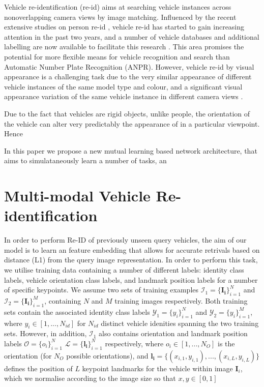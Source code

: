 \documentclass[10pt,twocolumn,letterpaper]{article}
\begin{document}
Vehicle re-identification (re-id) aims at searching vehicle instances across nonoverlapping camera views by image matching. Influenced by the recent extensive studies on person re-id \cite{gong2014re}, vehicle re-id has started to gain increasing attention in the past two years, and a number of vehicle databases and additional labelling are now available to facilitate this research \cite{liu2016vehicleid,liu2016veri,yang2015large,kanaci2018vehicle,wang2017orientation}. This area promises the potential for more flexible means for vehicle recognition and search than Automatic Number Plate Recognition (ANPR). However, vehicle re-id by visual appearance is a
challenging task due to the very similar appearance of different vehicle instances
of the same model type and colour, and a significant visual appearance variation
of the same vehicle instance in different camera views \cite{}.


Due to the fact that vehicles are rigid objects, unlike people, the orientation of the vehicle can alter very predictably the appearance of in a particular viewpoint. Hence

In this paper we propose a new mutual learning based network architecture, that aims to simulataneously learn a number of tasks, an

\section{Multi-modal Vehicle Re-identification}

In order to perform Re-ID of previously unseen query vehicles, the aim of our model is to learn an feature embedding that allows for accurate retrivals based on distance (\eg L1) from the query image representation. In order to perform this task, we utilise training data containing a number of different labels: identity class labels, vehicle orientation class labels, and landmark position labels for a number of specific keypoints. We assume two sets of training examples $\mathcal{I_1} = \{\mathbf{I_i}\}_{i=1}^N$ and $\mathcal{I}_2 = \{\mathbf{I_i}\}_{i=1}^M$, containing $N$ and $M$ training images respectively. Both training sets contain the associated identity class labels $\mathcal{Y}_1=\{y_i\}_{i=1}^N$ and $\mathcal{Y}_2=\{y_i\}_{i=1}^M$, where $y_i \in \left[1,...,N_{id}\right]$ for $N_{id}$ distinct vehicle idenities spanning the two training sets. However, in addition, $\mathcal{I}_1$ also contains orientation and landmark position labels $\mathcal{O}=\{o_i\}_{i=1}^N$ $\mathcal{L}=\{\mathbf{l_i}\}_{i=1}^N$ respectively, where $o_i \in \left[1,...,N_O\right]$ is the orientation (for $N_O$ possible orientations), and  $\mathbf{l_i}=\{\left(x_{i,1},y_{i,1}\right),...,\left(x_{i,L},y_{i,L}\right)\}$ defines the position of $L$ keypoint landmarks for the vehicle within image $\mathbf{I}_i$, which we normalise according to the image size so that $x,y \in [0,1]$
\end{document}
